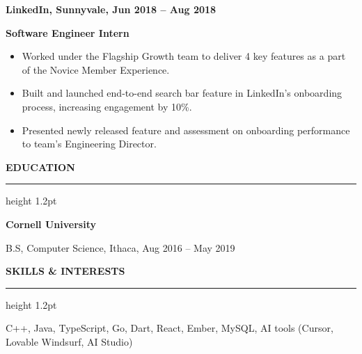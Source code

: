 \documentclass[11pt,a4paper]{article}
\newcommand{\sectionheading}[1]{%
  \vspace{1.25em}
  {\large\bfseries\MakeUppercase{#1}}\par
  \vspace{0.25em}
  \hrule height 1.2pt
  \vspace{0.95em}
}
\newcommand{\experience}[4]{%
  {\bfseries #1, #2, #3}\par
  {\bfseries #4}\par
  \vspace{0.35em}
}
\newenvironment{resumebullets}{%
  \begin{itemize}[
    leftmargin=1.55em,
    itemsep=0.18em,
    topsep=0pt,
    parsep=0pt,
    partopsep=0pt
  ]
}{%
  \end{itemize}
}
\begin{document}
\vspace{0.9em}
\experience{LinkedIn}{Sunnyvale}{Jun 2018 -- Aug 2018}{Software Engineer Intern}
\begin{resumebullets}
  \item Worked under the Flagship Growth team to deliver 4 key features as a part of the Novice Member Experience.
  \item Built and launched end-to-end search bar feature in LinkedIn's onboarding process, increasing engagement by 10\%.
  \item Presented newly released feature and assessment on onboarding performance to team's Engineering Director.
\end{resumebullets}

\sectionheading{Education}

{\bfseries Cornell University}\par
B.S, Computer Science, Ithaca, Aug 2016 -- May 2019

\sectionheading{Skills \& Interests}

C++, Java, TypeScript, Go, Dart, React, Ember, MySQL, AI tools (Cursor, Lovable Windsurf, AI Studio)
\end{document}
